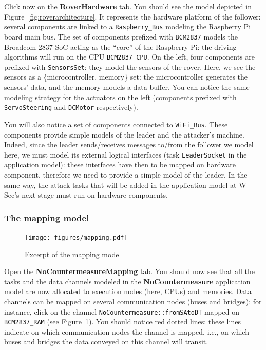 \documentclass{article}
\begin{document}
Click now on the \textbf{RoverHardware} tab. You should see the model depicted in Figure~\ref{fig:roverarchitecture}. It represents the hardware platform of the follower: several components are linked to a \texttt{Raspberry\_Bus} modeling the Raspberry Pi board main bus. The set of components prefixed with \texttt{BCM2837} models the Broadcom 2837 SoC acting as the ``core'' of the Raspberry Pi: the driving algorithms will run on the CPU \texttt{BCM2837\_CPU}. On the left, four components are prefixed with \texttt{SensorsSet}: they model the sensors of the rover. Here, we see the sensors as a \{microcontroller, memory\} set: the microcontroller generates the sensors' data, and the memory models a data buffer. You can notice the same modeling strategy for the actuators on the left (components prefixed with \texttt{ServoSteering} and \texttt{DCMotor} respectively).

You will also notice a set of components connected to \texttt{WiFi\_Bus}. These components provide simple models of the leader and the attacker's machine. Indeed, since the leader sends/receives messages to/from the follower we model here, we must model its external logical interfaces (task \texttt{LeaderSocket} in the application model): these interfaces have then to be mapped on hardware component, therefore we need to provide a simple model of the leader. In the same way, the attack tasks that will be added in the application model at W-Sec's next stage must run on hardware components.

\subsubsection{The mapping model}

\begin{figure}
	\centering
	\texttt{[image: figures/mapping.pdf]}
	\caption{Excerpt of the mapping model}
	\label{fig:rovermapping}
\end{figure}
Open the \textbf{NoCountermeasureMapping} tab. You should now see that all the tasks and the data channels modeled in the \textbf{NoCountermeasure} application model are now allocated to execution nodes (here, CPUs) and memories. Data channels can be mapped on several communication nodes (buses and bridges): for instance, click on the channel \texttt{NoCountermeasure::fromSAtoDT} mapped on \texttt{BCM2837\_RAM} (see Figure~\ref{fig:rovermapping}). You should notice red dotted lines: these lines indicate on which communication nodes the channel is mapped, i.e., on which buses and bridges the data conveyed on this channel will transit.
\end{document}
